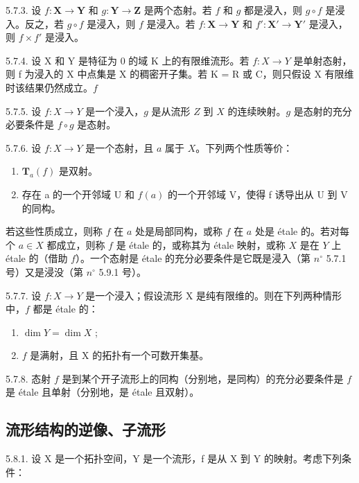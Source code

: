 5.7.3. 设 \(f: \mathbf{X} \to \mathbf{Y}\) 和 \(g: \mathbf{Y} \to \mathbf{Z}\) 是两个态射。若 \(f\) 和 \(g\) 都是浸入，则 \(g \circ f\) 是浸入。反之，若 \(g \circ f\) 是浸入，则 \(f\) 是浸入。若 \(f: \mathbf{X} \to \mathbf{Y}\) 和 \(f': \mathbf{X}' \to \mathbf{Y}'\) 是浸入，则 \(f \times f'\) 是浸入。

5.7.4. 设 X 和 Y 是特征为 0 的域 K 上的有限维流形。若 \(f:X\to Y\) 是单射态射，则 f 为浸入的 X 中点集是 X 的稠密开子集。若 K = R 或 C，则只假设 X 有限维时该结果仍然成立。\(f\)

5.7.5. 设 \(f:X\to Y\) 是一个浸入，\(g\) 是从流形 \(Z\) 到 \(X\) 的连续映射。\(g\) 是态射的充分必要条件是 \(f\circ g\) 是态射。

5.7.6. 设 \(f: X \to Y\) 是一个态射，且 \(a\) 属于 \(X\)。下列两个性质等价：

\begin{enumerate}
\def\labelenumi{(\roman{enumi})}
\item
  \(\mathbf{T}_{a}(f)\) 是双射。
\item
  存在 a 的一个开邻域 U 和 \(f(a)\) 的一个开邻域 V，使得 f 诱导出从 U 到 V 的同构。
\end{enumerate}

若这些性质成立，则称 \(f\) 在 \(a\) 处是局部同构，或称 \(f\) 在 \(a\) 处是 étale 的。若对每个 \(a \in X\) 都成立，则称 \(f\) 是 étale 的，或称其为 étale 映射，或称 \(X\) 是在 \(Y\) 上 étale 的（借助 \(f\)）。一个态射是 étale 的充分必要条件是它既是浸入（第 \(n^{\circ}\) 5.7.1 号）又是浸没（第 \(n^{\circ}\) 5.9.1 号）。

5.7.7. 设 \(f:X\to Y\) 是一个浸入；假设流形 X 是纯有限维的。则在下列两种情形中，\(f\) 都是 étale 的：

\begin{enumerate}
\def\labelenumi{(\roman{enumi})}
\item
  \(\dim Y = \dim X\) ;
\item
  \(f\) 是满射，且 X 的拓扑有一个可数开集基。
\end{enumerate}

5.7.8. 态射 \(f\) 是到某个开子流形上的同构（分别地，是同构）的充分必要条件是 \(f\) 是 étale 且单射（分别地，是 étale 且双射）。

\subsection{流形结构的逆像、子流形}

5.8.1. 设 X 是一个拓扑空间，Y 是一个流形，f 是从 X 到 Y 的映射。考虑下列条件：

